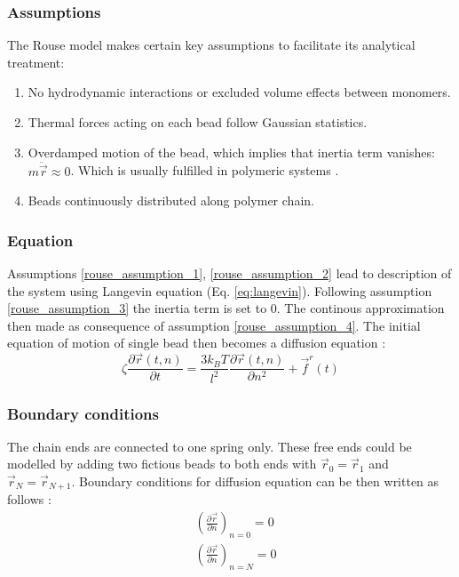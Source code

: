 \documentclass[
    paper=A4,pagesize=automedia,fontsize=12pt,
    BCOR=15mm,DIV=22,
    twoside,headinclude,footinclude=false,
    ngerman,fleqn,             %
    bibliography=totocnumbered,          %
    listof=totoc,                %
    listof=flat,                 %
    cleardoublepage=empty      %
    numbers=endperiod
]{scrartcl}
\begin{document}
\subsubsection{Assumptions}
The Rouse model makes certain key assumptions to facilitate its analytical treatment:
\begin{enumerate}
    \item \label{rouse_assumption_1} No hydrodynamic interactions or excluded volume effects between monomers.
    \item \label{rouse_assumption_2} Thermal forces acting on each bead follow Gaussian statistics.
    \item \label{rouse_assumption_3} Overdamped motion of the bead, which implies that inertia term vanishes: $m \ddot{\vec{r}} \approx 0$.
    Which is usually fulfilled in polymeric systems \cite{Doi_Intro_PP:2005}.
    \item \label{rouse_assumption_4} Beads continuously distributed along polymer chain.
\end{enumerate}

\subsubsection{Equation}
Assumptions \ref{rouse_assumption_1}, \ref{rouse_assumption_2} lead to description of the
system using Langevin equation (Eq. \ref{eq:langevin}). Following assumption \ref{rouse_assumption_3} 
the inertia term is set to 0. The continous approximation then made as consequence of assumption \ref{rouse_assumption_4}.
The initial equation of motion of single bead then becomes a diffusion equation \cite{Rub_Colby_PolyPhy:2005}:
\begin{equation}
    \label{eq:diffusion}
    \zeta \frac{\partial \vec{r}(t,n)}{\partial t} = \frac{3 k_B T}{l^2} \frac{\partial \vec{r}(t,n)}{\partial n^2} + \vec{f}^r(t)
\end{equation}

\subsubsection{Boundary conditions}
The chain ends are connected to one spring only. These free ends could be modelled by adding two 
fictious beads to both ends with $\vec{r}_0=\vec{r}_1$ and $\vec{r}_N=\vec{r}_{N+1}$. Boundary 
conditions for diffusion equation can be then written as follows \cite{Rub_Colby_PolyPhy:2005}:
\begin{equation}
    \label{eq:rouse_boundary}
    \begin{aligned}
        & \left(\frac{\partial \vec{r}}{\partial n}\right)_{n=0} = 0\\
        & \left(\frac{\partial \vec{r}}{\partial n}\right)_{n=N} = 0
    \end{aligned}
\end{equation}
\end{document}
